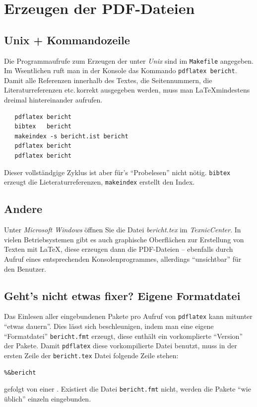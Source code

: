 
\section{Erzeugen der PDF-Dateien}

\subsection{Unix + Kommandozeile}
Die Programmaufrufe zum Erzeugen der  unter \emph{Unix}
sind im \texttt{Makefile} angegeben. Im Wsentlichen ruft man in der Konsole das Kommando
\texttt{pdflatex bericht}. Damit alle Referenzen innerhalb des Textes, die Seitennummern,
die Literaturreferenzen etc.\,korrekt ausgegeben werden, muss man \LaTeX mindestens dreimal hintereinander aufrufen.
\begin{verbatim}
   pdflatex bericht
   bibtex   bericht
   makeindex -s bericht.ist bericht
   pdflatex bericht
   pdflatex bericht
\end{verbatim}
Dieser vollständgige Zyklus ist aber für's \enquote{Probelesen} nicht nötig.
\texttt{bibtex}  erzeugt die Lieteraturreferenzen, \texttt{makeindex} erstellt den Index.

\subsection{Andere}
Unter \emph{Microsoft Windows} öffnen Sie die Datei \emph{bericht.tex} im \emph{TexnicCenter}.
In vielen Betriebsystemen gibt es auch graphische Oberflächen zur Erstellung von Texten mit \LaTeX,
diese erzeugen dann die PDF-Dateien -- ebenfalls durch Aufruf eines entsprechenden
Konsolenprogrammes, allerdings \enquote{unsichtbar} für den Benutzer.

\subsection{Geht's nicht etwas fixer? Eigene Formatdatei}
Das Einlesen aller eingebundenen Pakete pro Aufruf von \texttt{pdflatex} kann mitunter
\enquote{etwas dauern}. Dies lässt sich beschleunigen, indem man eine eigene \enquote{Formatdatei}
 \texttt{bericht.fmt} erzeugt, diese enthält ein vorkomplierte \enquote{Version}
der Pakete. Damit \texttt{pdflatex} diese vorkompilierte Datei benutzt, muss in der ersten Zeile der
\texttt{bericht.tex} Datei folgende Zeile stehen:
\begin{verbatim}
%&bericht
\end{verbatim}
gefolgt von einer . Existiert die Datei \texttt{bericht.fmt} nicht, werden die Pakete
\enquote{wie üblich} einzeln eingebunden.

